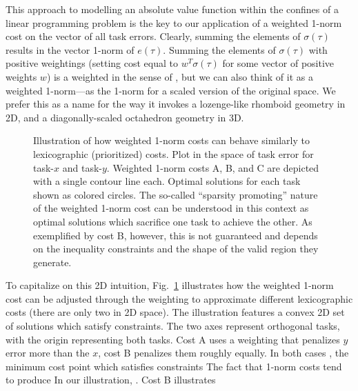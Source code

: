 This approach to modelling an absolute value function within the confines of a linear programming problem is the key to our application of a weighted 1-norm cost on the vector of all task errors. Clearly, summing the elements of $\sigma(\tau)$ results in the vector 1-norm of $e(\tau)$. Summing the elements of $\sigma(\tau)$ with positive weightings (setting cost equal to $w^T\sigma(\tau)$ for some vector of positive weights $w$) is a weighted  in the sense of \cite{BouyarmaneKheddar2017TAC}, but we can also think of it as a weighted 1-norm---as the 1-norm for a scaled version of the original space. We prefer this as a name for the way it invokes a lozenge-like rhomboid geometry in 2D, and a diagonally-scaled octahedron geometry in 3D.


\begin{figure}\centering\footnotesize
	\def\svgwidth{\columnwidth}
	
	\caption{Illustration of how weighted 1-norm costs can behave similarly to lexicographic (prioritized) costs. Plot in the space of task error for task-$x$ and task-$y$. Weighted 1-norm costs A, B, and C are depicted with a single contour line each. Optimal solutions for each task shown as colored circles. The so-called ``sparsity promoting'' nature of the weighted 1-norm cost can be understood in this context as optimal solutions which sacrifice one task to achieve the other. As exemplified by cost B, however, this is not guaranteed and depends on the inequality constraints and the shape of the valid region they generate. }\label{fig:onpwbc}
\end{figure}



To capitalize on this 2D intuition, Fig.~\ref{fig:onpwbc} illustrates how the weighted 1-norm cost can be adjusted through the weighting to approximate different lexicographic costs (there are only two in 2D space). The illustration features a convex 2D set of solutions which satisfy constraints. The two axes represent orthogonal tasks, with the origin representing  both tasks. Cost A uses a weighting that penalizes $y$ error more than the $x$, cost B penalizes them roughly equally. In both cases , the minimum cost point which satisfies constraints  The fact that 1-norm costs tend to produce  
In our illustration, .
Cost B illustrates 

